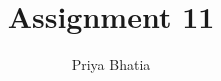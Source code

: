 \documentclass[journal,12pt,twocolumn]{IEEEtran}
\begin{document}
\makeatletter
{}
\makeatother
\let\StandardTheFigure\thefigure
\let\vec\mathbf
\renewcommand{\thefigure}{\theproblem}
\def\putbox#1#2#3{\makebox[0in][l]{\makebox[#1][l]{}\raisebox{\baselineskip}[0in][0in]{\raisebox{#2}[0in][0in]{#3}}}}
     \def\rightbox#1{\makebox[0in][r]{#1}}
     \def\centbox#1{\makebox[0in]{#1}}
     \def\topbox#1{\raisebox{-\baselineskip}[0in][0in]{#1}}
     \def\midbox#1{\raisebox{-0.5\baselineskip}[0in][0in]{#1}}
\vspace{3cm}
\title{Assignment 11}
\author{Priya Bhatia}
%
%
%
% 
%
\end{document}
